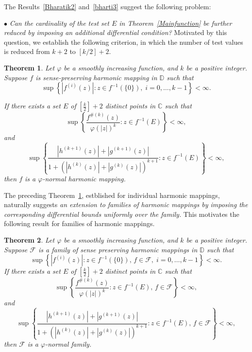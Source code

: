 \documentclass[10pt,a4paper]{amsart}
\numberwithin{equation}{section}
\newtheorem{theorem}{Theorem}[section]
\begin{document}
The Results~\ref{Bharatik2} and~\ref{bharti3} suggest the following 
problem: \smallskip

$\bullet$ {\it Can the cardinality of the test set $E$ in 
Theorem~\ref{Mainfunction} be further reduced by imposing 
an additional differential condition?}
Motivated by this question, we establish the following 
criterion, in which the number of test values is 
reduced from $k+2$ to $[k/2]+2$.



\begin{theorem}\label{K: twovaluefunction}
Let $\varphi$ be a smoothly increasing function, and
$k$ be a positive integer. Suppose $f$ is sense-preserving 
harmonic mapping in $\mathbb{D}$ such that
\begin{equation}\label{eq: K: 1twovaluefunction}
\sup\left\{
|f^{(i)}(z)|:
z\in f^{-1}(\{0\}),\;
i=0,\ldots,k-1
\right\}<\infty.
\end{equation}

If there exists a set $E$ of $\left[\frac{k}{2}\right]+2$ 
distinct points in $\mathbb{C}$ such that
\begin{equation}\label{eq: K: 2twovaluefunction}
\sup\left\{
\frac{f^{\#(k)}(z)}{\varphi(|z|)^k}
:
z\in f^{-1}(E)
\right\}
<\infty,
\end{equation}
and
\begin{equation}\label{eq: K: 3twovaluefunction}
\sup\left\{
\frac{|h^{(k+1)}(z)|+|g^{(k+1)}(z)|}
{1+\left(|h^{(k)}(z)|+|g^{(k)}(z)|\right)^{k+1}}
:
z\in f^{-1}(E)
\right\}
<\infty,
\end{equation}
then $f$ is a $\varphi$-normal harmonic mapping.
\end{theorem}


The preceding Theorem~\ref{K: twovaluefunction}, estblished for 
individual harmonic mappings, naturally suggests {\it an extension 
to families of harmonic mappings by imposing the corresponding
differential bounds uniformly over the family.} This motivates
the following result for families of harmonic mappings.
\begin{theorem}\label{K: twovaluefamily}
Let $\varphi$ be a smoothly increasing function, and
$k$ be a positive integer. Suppose $\mathcal{F}$ is a family 
of sense preserving harmonic mappings in $\mathbb{D}$ such that
\begin{equation}\label{eq:K: 1twovaluefunction}
\sup\left\{
|f^{(i)}(z)|:
z\in f^{-1}(\{0\}),\, f \in \mathcal{F}, \;
i=0,\ldots,k-1
\right\}<\infty.
\end{equation}
If there exists a set $E$ of $\left[\frac{k}{2}\right]+2$
 distinct points in $\mathbb{C}$ such that
\begin{equation}\label{eq:K: 2twovaluefamily}
\sup\left\{
\frac{f^{\#(k)}(z)}{\varphi(|z|)^k}
:
z\in f^{-1}(E), \, f \in \mathcal{F}
\right\}
<\infty,
\end{equation}
and
\begin{equation}\label{eq:K: 3twovaluefamily}
\sup\left\{
\frac{|h^{(k+1)}(z)|+|g^{(k+1)}(z)|}
{1+\left(|h^{(k)}(z)|+|g^{(k)}(z)|\right)^{k+1}}
:
z\in f^{-1}(E), \, f \in \mathcal{F}
\right\}
<\infty,
\end{equation}
then $\mathcal{F}$ is a $\varphi$-normal family.
\end{theorem}
 
\end{document}
